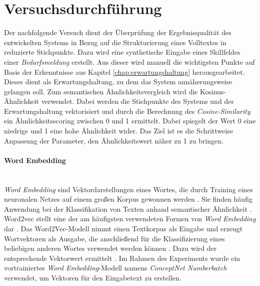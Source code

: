 \section{Versuchsdurchführung}
Der nachfolgende Versuch dient der Überprüfung der Ergebnisqualität des entwickelten Systems in Bezug auf die Strukturierung eines Volltextes in reduzierte Stichpunkte. Dazu wird eine synthetische Eingabe eines Skillfeldes einer \emph{Bedarfsmeldung} erstellt. Aus dieser wird manuell die wichtigsten Punkte auf Basis der Erkenntnisse aus Kapitel \ref{chap:erwartungshaltung} herausgearbeitet. Dieses dient als Erwartungshaltung, zu dem das System annäherungsweise gelangen soll. Zum semantischen Ähnlichkeitsvergleich wird die Kosinus-Ähnlichkeit verwendet. Dabei werden die Stichpunkte des Systems und der Erwartungshaltung vektorisiert und durch die Berechnung des \emph{Cosine-Similarity} ein Ähnlichkeitsscoring zwischen 0 und 1 ermittelt. Dabei spiegelt der Wert 0 eine niedrige und 1 eine hohe Ähnlichkeit wider. Das Ziel ist es die Schrittweise Anpassung der Parameter, den Ähnlichkeitswert näher zu 1 zu bringen. 
\paragraph{Word Embedding}\mbox{}\\
\emph{Word Embedding} sind Vektordarstellungen eines Wortes, die durch Training eines neuronalen Netzes auf einem großen Korpus gewonnen werden \cite{sitikhu2019comparison}. Sie finden häufig Anwendung bei der Klassifikation von Texten anhand semantischer Ähnlichkeit \cite{sitikhu2019comparison}. Word2vec stellt eine der am häufigsten verwendeten Formen von \emph{Word Embedding} dar \cite{sitikhu2019comparison}. Das Word2Vec-Modell nimmt einen Textkorpus als Eingabe und erzeugt Wortvektoren als Ausgabe, die anschließend für die Klassifizierung eines beliebigen anderen Wortes verwendet werden können \cite{sitikhu2019comparison}. Dazu wird der entsprechende Vektorwert ermittelt \cite{sitikhu2019comparison}. Im Rahmen des Experiments wurde ein vortrainiertes \emph{Word Embedding}-Modell namens \emph{ConceptNet Numberbatch} \cite{speer2017conceptnet} verwendet, um Vektoren für den Eingabetext zu erstellen.
